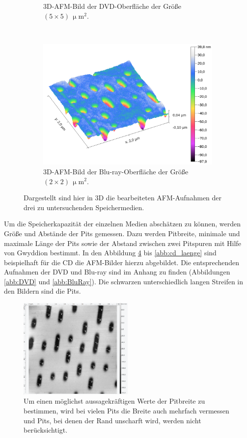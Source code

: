 \begin{figure}[H]
\begin{subfigure}[t]{0.5\textwidth}
	\caption{3D-AFM-Bild der DVD-Oberfl\"ache der Gr\"o{\ss}e $(5 \times 5) \, \upmu \text{m}^2$.}
	\label{abb:dvd_3d}
	\end{subfigure}
	~
	\begin{subfigure}[t]{0.5\textwidth}
	\includegraphics[width=\textwidth]{AFM_auswertung/bluray_3d.png}
	\caption{3D-AFM-Bild der Blu-ray-Oberfl\"ache der Gr\"o{\ss}e $(2 \times 2) \, \upmu \text{m}^2$.}
	\label{abb:br_3d}
	\end{subfigure}
\caption{Dargestellt sind hier in 3D die bearbeiteten AFM-Aufnahmen der drei zu untersuchenden Speichermedien.}
\label{abb:3d}
\end{figure}
Um die Speicherkapazit\"at der einzelnen Medien absch\"atzen zu k\"onnen, werden Gr\"o{\ss}e und Abst\"ande der Pits gemessen.
Dazu werden Pitbreite, minimale und maximale L\"ange der Pits sowie der Abstand zwischen zwei Pitspuren mit Hilfe von Gwyddion bestimmt.
In den Abbildung \ref{abb:cd_pitbreite} bis \ref{abb:cd_laenge} sind beispielhaft f\"ur die CD die AFM-Bilder hierzu abgebildet.
Die entsprechenden Aufnahmen der DVD und Blu-ray sind im Anhang zu finden (Abbildungen \ref{abb:DVD} und \ref{abb:BluRay}).
Die schwarzen unterschiedlich langen Streifen in den Bildern sind die Pits.%
\begin{figure}
\centering
	\includegraphics[width=0.5\textwidth]{AFM_auswertung/cd_breite.png}
	\caption{Um einen m\"oglichst aussagekr\"aftigen Werte der Pitbreite zu bestimmen, wird bei vielen Pits die Breite auch mehrfach vermessen und Pits, bei denen der Rand unscharft wird, werden nicht ber\"ucksichtigt.}
	\label{abb:cd_pitbreite}
\end{figure}
